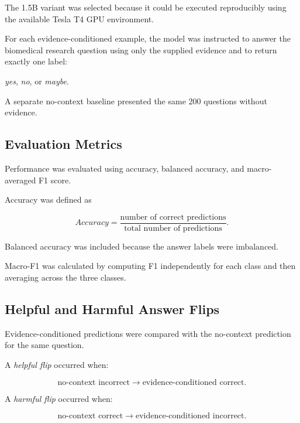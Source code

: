 \documentclass[conference]{IEEEtran}
\begin{document}
The 1.5B variant was selected because it could be executed reproducibly using the available Tesla T4 GPU environment.

For each evidence-conditioned example, the model was instructed to answer the biomedical research question using only the supplied evidence and to return exactly one label:

\begin{center}
\textit{yes}, \textit{no}, or \textit{maybe}.
\end{center}

A separate no-context baseline presented the same 200 questions without evidence.

\subsection{Evaluation Metrics}

Performance was evaluated using accuracy, balanced accuracy, and macro-averaged F1 score.

Accuracy was defined as

\begin{equation}
Accuracy =
\frac{\text{number of correct predictions}}
{\text{total number of predictions}}.
\end{equation}

Balanced accuracy was included because the answer labels were imbalanced.

Macro-F1 was calculated by computing F1 independently for each class and then averaging across the three classes.

\subsection{Helpful and Harmful Answer Flips}

Evidence-conditioned predictions were compared with the no-context prediction for the same question.

A \textit{helpful flip} occurred when:

\begin{equation}
\text{no-context incorrect}
\rightarrow
\text{evidence-conditioned correct}.
\end{equation}

A \textit{harmful flip} occurred when:

\begin{equation}
\text{no-context correct}
\rightarrow
\text{evidence-conditioned incorrect}.
\end{equation}
\end{document}
